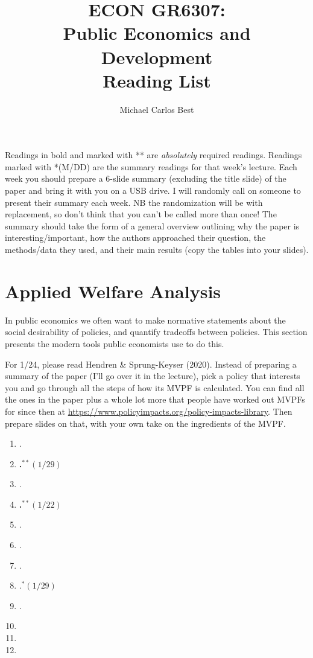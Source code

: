 \documentclass[11pt]{article}
\begin{document}
\title{ECON GR6307: \\ Public Economics and Development \\ Reading List}
\author{Michael Carlos Best}

\maketitle

Readings in bold and marked with ** are \textit{absolutely} required readings. Readings marked with *(M/DD) are the summary readings for that week's lecture. Each week you should prepare a 6-slide summary (excluding the title slide) of the paper and bring it with you on a USB drive. I will randomly call on someone to present their summary each week. NB the randomization will be with replacement, so don't think that you can't be called more than once! The summary should take the form of a general overview outlining why the paper is interesting/important, how the authors approached their question, the methods/data they used, and their main results (copy the tables into your slides).

\section{Applied Welfare Analysis}

In public economics we often want to make normative statements about the social desirability of policies, and quantify tradeoffs between policies. This section presents the modern tools public economists use to do this. 

For 1/24, please read Hendren \& Sprung-Keyser (2020). Instead of preparing a summary of the paper (I'll go over it in the lecture), pick a policy that interests you and go through all the steps of how its MVPF is calculated. You can find all the ones in the paper plus a whole lot more that people have worked out MVPFs for since then at \url{https://www.policyimpacts.org/policy-impacts-library}. Then prepare slides on that, with your own take on the ingredients of the MVPF.

\begin{enumerate}
\item {}.
\item \textbf{.$^{**}(1/29)$}
\item {}.
\item \textbf{.$^{**}(1/22)$}
\item {}.
\item {}.
\item {}.
\item {}.$^{*}(1/29)$
\item {}.
\item {}
\item {}
\item {}
\end{enumerate}
\end{document}
